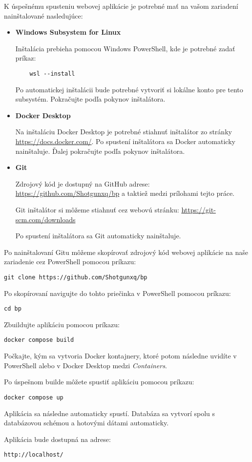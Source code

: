 K úspešnému spusteniu webovej aplikácie je potrebné mať na vašom zariadení nainštalované nasledujúce:

\begin{itemize}
    \item \textbf{Windows Subsystem for Linux}

    Inštalácia prebieha pomocou Windows PowerShell, kde je potrebné zadať príkaz:
    \begin{verbatim}
    wsl --install
    \end{verbatim}
    Po automatickej inštalácii bude potrebné vytvoriť si lokálne konto pre tento subsystém. Pokračujte podľa pokynov inštalátora.

    \item \textbf{Docker Desktop}

    Na inštaláciu Docker Desktop je potrebné stiahnuť inštalátor zo stránky \url{https://docs.docker.com/}. Po spustení inštalátora sa Docker automaticky nainštaluje. Ďalej pokračujte podľa pokynov inštalátora.

    \item \textbf{Git}

    Zdrojový kód je dostupný na GitHub adrese: \url{https://github.com/Shotgunxq/bp} a taktiež medzi prílohami tejto práce.

    Git inštalátor si môžeme stiahnuť cez webovú stránku: \url{https://git-scm.com/downloads}

    Po spustení inštalátora sa Git automaticky nainštaluje.
\end{itemize}

Po nainštalovaní Gitu môžeme skopírovať zdrojový kód webovej aplikácie na naše zariadenie cez PowerShell pomocou príkazu:
\begin{verbatim}
git clone https://github.com/Shotgunxq/bp
\end{verbatim}

Po skopírovaní navigujte do tohto priečinka v PowerShell pomocou príkazu:
\begin{verbatim}
cd bp
\end{verbatim}

Zbuildujte aplikáciu pomocou príkazu:
\begin{verbatim}
docker compose build
\end{verbatim}
Počkajte, kým sa vytvoria Docker kontajnery, ktoré potom následne uvidíte v PowerShell alebo v Docker Desktop medzi \textit{Containers}.

Po úspešnom builde môžete spustiť aplikáciu pomocou príkazu:
\begin{verbatim}
docker compose up
\end{verbatim}

Aplikácia sa následne automaticky spustí. Databáza sa vytvorí spolu s databázovou schémou a hotovými dátami automaticky.

Aplikácia bude dostupná na adrese:
\begin{verbatim}
http://localhost/
\end{verbatim}
